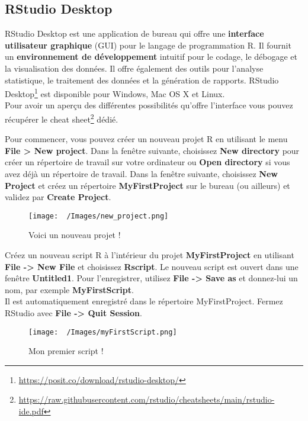 \documentclass[
]{article}
\begin{document}
\hypertarget{rstudio-desktop}{%
\subsection{RStudio Desktop}\label{rstudio-desktop}}

RStudio Desktop est une application de bureau qui offre une \textbf{interface utilisateur graphique} (GUI) pour le
langage de programmation R. Il fournit un \textbf{environnement de développement} intuitif pour le codage, le débogage et la visualisation des données. Il offre également des outils pour l'analyse statistique, le traitement des données et la génération de rapports. RStudio Desktop\footnote{\url{https://posit.co/download/rstudio-desktop/}} est disponible pour Windows, Mac OS X et Linux.\\
Pour avoir un aperçu des différentes possibilités qu'offre l'interface vous pouvez récupérer le cheat sheet\footnote{\url{https://raw.githubusercontent.com/rstudio/cheatsheets/main/rstudio-ide.pdf}} dédié.

Pour commencer, vous pouvez créer un nouveau projet R en utilisant le menu \textbf{File \textgreater{} New project}. Dans
la fenêtre suivante, choisissez \textbf{New directory} pour créer un répertoire de travail sur votre ordinateur ou
\textbf{Open directory} si vous avez déjà un répertoire de travail. Dans la fenêtre suivante, choisissez \textbf{New Project} et créez un répertoire \textbf{MyFirstProject} sur le bureau (ou ailleurs) et validez par \textbf{Create Project}.\\

\begin{figure}
\centering
\texttt{[image: ~/Images/new\_project.png]}
\caption{Voici un nouveau projet !}
\end{figure}

Créez un nouveau script R à l'intérieur du projet \textbf{MyFirstProject} en utilisant \textbf{File -\textgreater{} New File} et
choisissez \textbf{Rscript}. Le nouveau script est ouvert dans une fenêtre \textbf{Untitled1}. Pour
l'enregistrer, utilisez \textbf{File -\textgreater{} Save as} et donnez-lui un nom, par exemple \textbf{MyFirstScript}.\\
Il est automatiquement enregistré dans le répertoire MyFirstProject. Fermez RStudio avec \textbf{File -\textgreater{} Quit Session}.~

\begin{figure}
\centering
\texttt{[image: ~/Images/myFirstScript.png]}
\caption{Mon premier script !}
\end{figure}
\end{document}
